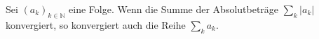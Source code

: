 Sei $(a_k)_{k \in \mathbb{N}}$ eine Folge. Wenn die Summe der Absolutbeträge $\sum\limits_k |a_k|$ konvergiert, so konvergiert auch die Reihe $\sum\limits_k a_k$.